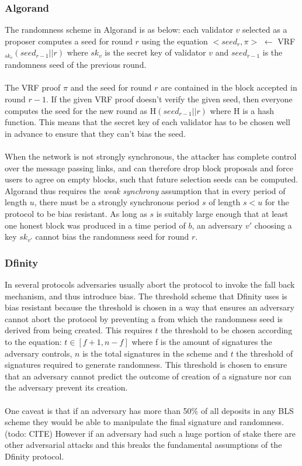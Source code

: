 \documentclass[10pt,journal,compsoc]{IEEEtran}
\begin{document}
\subsubsection{Algorand}
The randomness scheme in Algorand is as below:
each validator $v$ selected as a proposer computes a seed for round $r$ using the equation $< seed_r, \pi >$ $\leftarrow$ VRF$_{sk_{v}}(seed_{r-1}||r)$ where $sk_v$ is the secret key of validator $v$ and $seed_{r-1}$ is the randomness seed of the previous round.
\\\\    
The VRF proof $\pi$ and the seed for round $r$ are contained in the block accepted in round $r-1$. If the given VRF proof doesn't verify the given seed, then everyone computes the seed for the new round as H$(seed_{r-1}||r)$ where H is a hash function. This means that the secret key of each validator has to be chosen well in advance to ensure that they can't bias the seed.
\\\\
When the network is not strongly synchronous, the attacker has complete control over the message passing links, and can therefore drop block proposals and force users to agree on empty blocks, such that future selection seeds can be computed. Algorand thus requires the \emph{weak synchrony} assumption that in every period of length $u$, there must be a strongly synchronous period $s$ of length $s < u$ for the protocol to be bias resistant.  As long as $s$ is suitably large enough that at least one honest block was produced in a time period of $b$, an adversary $v'$ choosing a key $sk_{v'}$ cannot bias the randomness seed for round $r$. 

\subsubsection{Dfinity}
In several protocols adversaries usually abort the protocol to invoke the fall back mechanism, and thus introduce bias. The threshold scheme that Dfinity uses is bias resistant because the threshold is chosen in a way that ensures an adversary cannot abort the protocol by preventing a  from which the randomness seed is derived from being created. This requires $t$ the threshold to be chosen according to the equation: 
$t \in [f+1, n-f]$ where f is the amount of signatures the adversary controls,  
$n$ is the total signatures in the scheme and $t$ the threshold of signatures required to generate randomness. This threshold is chosen to ensure that an adversary cannot predict the outcome of creation of a signature nor can the adversary prevent its creation. 
\\\\
One caveat is that if an adversary has more than 50\% of all deposits in any BLS scheme they would be able to manipulate the final signature and randomness. (todo: CITE) However if an adversary had such a huge portion of stake there are other adversarial attacks and this breaks the fundamental assumptions of the Dfinity protocol.
\end{document}

